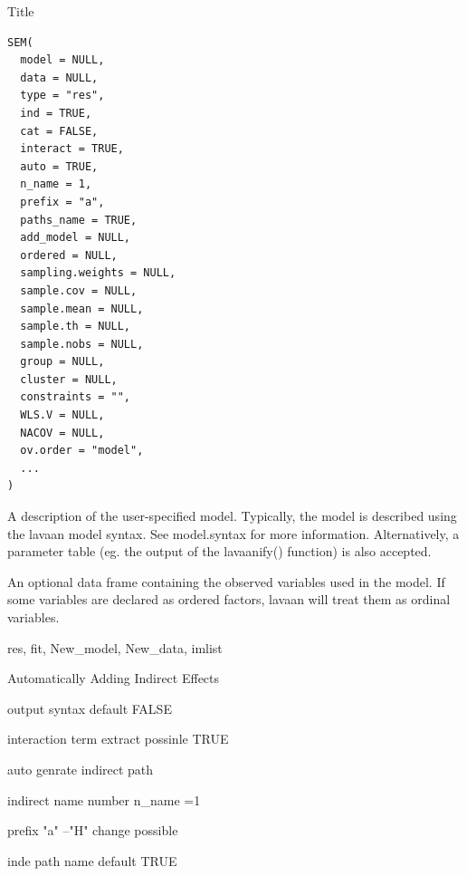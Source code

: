 \documentclass[a4paper]{book}
\begin{document}
%
\begin{Description}
Title
\end{Description}
%
\begin{Usage}
\begin{verbatim}
SEM(
  model = NULL,
  data = NULL,
  type = "res",
  ind = TRUE,
  cat = FALSE,
  interact = TRUE,
  auto = TRUE,
  n_name = 1,
  prefix = "a",
  paths_name = TRUE,
  add_model = NULL,
  ordered = NULL,
  sampling.weights = NULL,
  sample.cov = NULL,
  sample.mean = NULL,
  sample.th = NULL,
  sample.nobs = NULL,
  group = NULL,
  cluster = NULL,
  constraints = "",
  WLS.V = NULL,
  NACOV = NULL,
  ov.order = "model",
  ...
)
\end{verbatim}
\end{Usage}
%
\begin{Arguments}
\begin{ldescription}
\item[\code{model}] A description of the user-specified model. Typically, the model is
described using the lavaan model syntax. See model.syntax for more information.
Alternatively, a parameter table (eg. the output of the lavaanify() function)
is also accepted.

\item[\code{data}] An optional data frame containing the observed variables used in the model.
If some variables are declared as ordered factors,
lavaan will treat them as ordinal variables.

\item[\code{type}] res, fit, New\_model, New\_data, imlist

\item[\code{ind}] Automatically Adding Indirect Effects

\item[\code{cat}] output syntax default FALSE

\item[\code{interact}] interaction term extract possinle TRUE

\item[\code{auto}] auto genrate indirect path

\item[\code{n\_name}] indirect name number n\_name =1

\item[\code{prefix}] prefix "a" --"H" change possible

\item[\code{paths\_name}] inde path name default TRUE


\end{ldescription}
\end{Arguments}
\end{document}
